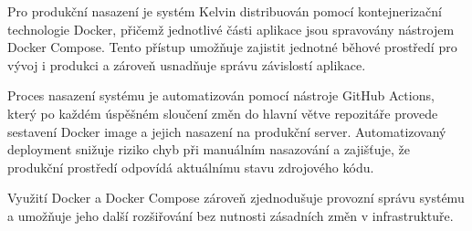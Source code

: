 Pro produkční nasazení je systém Kelvin distribuován pomocí kontejnerizační technologie Docker, přičemž jednotlivé části aplikace jsou spravovány nástrojem Docker Compose.
Tento přístup umožňuje zajistit jednotné běhové prostředí pro vývoj i produkci a zároveň usnadňuje správu závislostí aplikace.

Proces nasazení systému je automatizován pomocí nástroje GitHub Actions, který po každém úspěšném sloučení změn do hlavní větve repozitáře provede sestavení Docker image a jejich nasazení na produkční server.
Automatizovaný deployment snižuje riziko chyb při manuálním nasazování a zajišťuje, že produkční prostředí odpovídá aktuálnímu stavu zdrojového kódu.

Využití Docker a Docker Compose zároveň zjednodušuje provozní správu systému a umožňuje jeho další rozšiřování bez nutnosti zásadních změn v infrastruktuře.

\endinput
